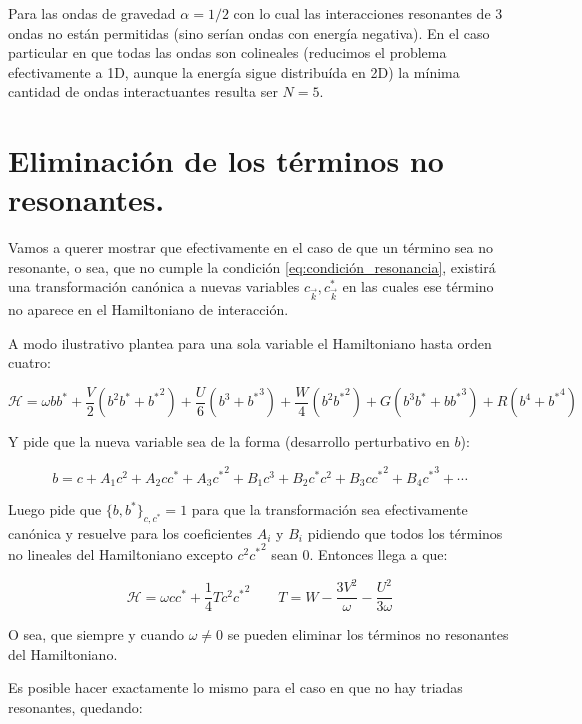 Para las ondas de gravedad $\alpha=1/2$ con lo cual las interacciones resonantes de 3 ondas no están permitidas (sino serían ondas con energía negativa). En el caso particular en que todas las ondas son colineales (reducimos el problema efectivamente a 1D, aunque la energía sigue distribuída en 2D) la mínima cantidad de ondas interactuantes resulta ser $N=5$. \cite{nazarenkoWaveTurbulence2011}

\section{Eliminación de los términos no resonantes.}
Vamos a querer mostrar que efectivamente en el caso de que un término sea no resonante, o sea, que no cumple la condición \eqref{eq:condición_resonancia}, existirá una transformación canónica a nuevas variables $c_{\vec k}, c_{\vec k}^*$ en las cuales ese término no aparece en el Hamiltoniano de interacción. 

A modo ilustrativo \cite{zakharovKolmogorovSpectraTurbulence1992} plantea para una sola variable el Hamiltoniano hasta orden cuatro:

\begin{equation}
	\mathcal{H} = \omega bb^*+\frac{V}{2}(b^2b^*+{b^*}^2) + \frac{U}{6}(b^3+{b^*}^3) + \frac{W}{4}(b^2{b^*}^2) + G(b^3b^*+b{b^*}^3) + R (b^4+{b^*}^4)
\end{equation}

Y pide que la nueva variable sea de la forma (desarrollo perturbativo en $b$):

\begin{equation}
	b = c + A_1c^2+A_2cc^*+A_3{c^*}^2 + B_1c^3+B_2c^*c^2+B_3c{c^*}^2+B_4{c^*}^3+\cdots
\end{equation}

Luego pide que $\{b,b^*\}_{c,c^*}=1$ para que la transformación sea efectivamente canónica y resuelve para los coeficientes $A_i$ y $B_i$ pidiendo que todos los términos no lineales del Hamiltoniano excepto $c^2{c^*}^2$ sean 0. Entonces llega a que:

\begin{equation}
	\mathcal{H} = \omega cc^* + \frac{1}{4} Tc^2{c^*}^2 \qquad T=W-\frac{3V^2}{\omega}-\frac{U^2}{3\omega}
\end{equation}

O sea, que siempre y cuando $\omega \neq 0$ se pueden eliminar los términos no resonantes del Hamiltoniano. 

Es posible hacer exactamente lo mismo para el caso en que no hay triadas resonantes, quedando: 

